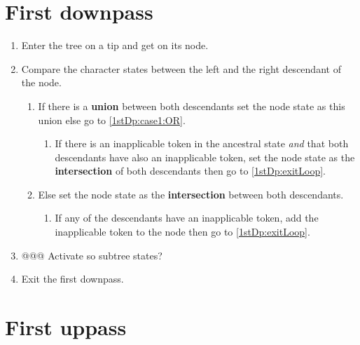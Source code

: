 \documentclass[a4paper,12pt]{article}
\begin{document}


\section{First downpass}

\begin{enumerate}
    \item Enter the tree on a tip and get on its node.
    \item Compare the character states between the left and the right descendant of the node.
    \begin{enumerate}
        \item \label{1stDp:case1:AND} If there is a \textbf{union} between both descendants set the node state as this union else go to \ref{1stDp:case1:OR}.
        \begin{enumerate}
            \item If there is an inapplicable token in the ancestral state \textit{and} that both descendants have also an inapplicable token, set the node state as the \textbf{intersection} of both descendants then go to \ref{1stDp:exitLoop}.
        \end{enumerate}
        \item \label{1stDp:case1:OR} Else set the node state as the \textbf{intersection} between both descendants.
        \begin{enumerate}
            \item If any of the descendants have an inapplicable token, add the inapplicable token to the node then go to \ref{1stDp:exitLoop}.
        \end{enumerate}
    \end{enumerate}
    \item @@@ Activate so subtree states? %
    \item \label{1stDp:exitLoop} Exit the first downpass.
\end{enumerate}

\section{First uppass}
\end{document}

